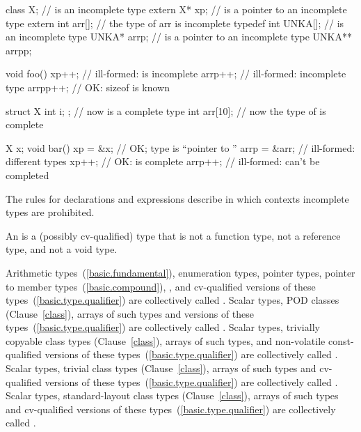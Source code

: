 %
\begin{codeblock}
class X;                        //  is an incomplete type
extern X* xp;                   //  is a pointer to an incomplete type
extern int arr[];               // the type of arr is incomplete
typedef int UNKA[];             //  is an incomplete type
UNKA* arrp;                     //  is a pointer to an incomplete type
UNKA** arrpp;

void foo() {
  xp++;                         // ill-formed:  is incomplete
  arrp++;                       // ill-formed: incomplete type
  arrpp++;                      // OK: sizeof  is known
}

struct X { int i; };            // now  is a complete type
int  arr[10];                   // now the type of  is complete

X x;
void bar() {
  xp = &x;                      // OK; type is ``pointer to ''
  arrp = &arr;                  // ill-formed: different types
  xp++;                         // OK:   is complete
  arrp++;                       // ill-formed:  can't be completed
}
\end{codeblock}
\exitexample 

\pnum
\enternote The rules for declarations and expressions describe in which
contexts incomplete types are prohibited. \exitnote

\pnum
{}%
An  is a (possibly cv-qualified) type that is not
a function type, not a reference type, and not a void type.

\pnum
Arithmetic types~(\ref{basic.fundamental}), enumeration types, pointer
types, pointer to member types~(\ref{basic.compound}),
,
and
cv-qualified versions of these
types~(\ref{basic.type.qualifier}) are collectively called
%
. Scalar types,
POD classes (Clause~\ref{class}), arrays of such types and
 versions of these
types~(\ref{basic.type.qualifier}) are collectively called
%
.
Scalar types, trivially copyable class types (Clause~\ref{class}), arrays of
such types, and non-volatile const-qualified versions of these
types~(\ref{basic.type.qualifier}) are collectively called .
Scalar types, trivial class types (Clause~\ref{class}),
arrays of such types and cv-qualified versions of these
types~(\ref{basic.type.qualifier}) are collectively called
. Scalar types, standard-layout class
types (Clause~\ref{class}), arrays of such types and
cv-qualified versions of these types~(\ref{basic.type.qualifier})
are collectively called .

